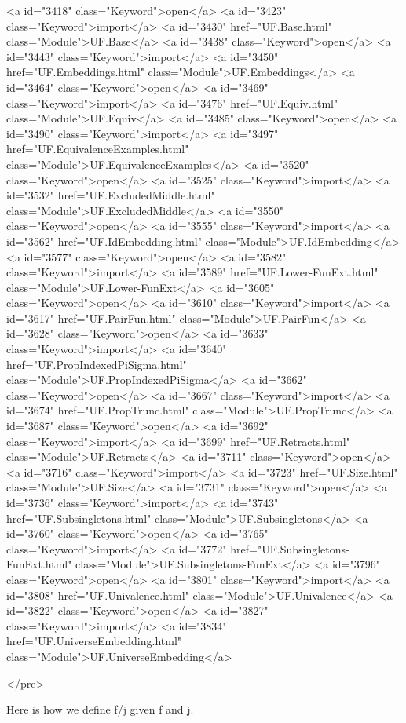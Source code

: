 <a id="3418" class="Keyword">open</a> <a id="3423" class="Keyword">import</a> <a id="3430" href="UF.Base.html" class="Module">UF.Base</a>
<a id="3438" class="Keyword">open</a> <a id="3443" class="Keyword">import</a> <a id="3450" href="UF.Embeddings.html" class="Module">UF.Embeddings</a>
<a id="3464" class="Keyword">open</a> <a id="3469" class="Keyword">import</a> <a id="3476" href="UF.Equiv.html" class="Module">UF.Equiv</a>
<a id="3485" class="Keyword">open</a> <a id="3490" class="Keyword">import</a> <a id="3497" href="UF.EquivalenceExamples.html" class="Module">UF.EquivalenceExamples</a>
<a id="3520" class="Keyword">open</a> <a id="3525" class="Keyword">import</a> <a id="3532" href="UF.ExcludedMiddle.html" class="Module">UF.ExcludedMiddle</a>
<a id="3550" class="Keyword">open</a> <a id="3555" class="Keyword">import</a> <a id="3562" href="UF.IdEmbedding.html" class="Module">UF.IdEmbedding</a>
<a id="3577" class="Keyword">open</a> <a id="3582" class="Keyword">import</a> <a id="3589" href="UF.Lower-FunExt.html" class="Module">UF.Lower-FunExt</a>
<a id="3605" class="Keyword">open</a> <a id="3610" class="Keyword">import</a> <a id="3617" href="UF.PairFun.html" class="Module">UF.PairFun</a>
<a id="3628" class="Keyword">open</a> <a id="3633" class="Keyword">import</a> <a id="3640" href="UF.PropIndexedPiSigma.html" class="Module">UF.PropIndexedPiSigma</a>
<a id="3662" class="Keyword">open</a> <a id="3667" class="Keyword">import</a> <a id="3674" href="UF.PropTrunc.html" class="Module">UF.PropTrunc</a>
<a id="3687" class="Keyword">open</a> <a id="3692" class="Keyword">import</a> <a id="3699" href="UF.Retracts.html" class="Module">UF.Retracts</a>
<a id="3711" class="Keyword">open</a> <a id="3716" class="Keyword">import</a> <a id="3723" href="UF.Size.html" class="Module">UF.Size</a>
<a id="3731" class="Keyword">open</a> <a id="3736" class="Keyword">import</a> <a id="3743" href="UF.Subsingletons.html" class="Module">UF.Subsingletons</a>
<a id="3760" class="Keyword">open</a> <a id="3765" class="Keyword">import</a> <a id="3772" href="UF.Subsingletons-FunExt.html" class="Module">UF.Subsingletons-FunExt</a>
<a id="3796" class="Keyword">open</a> <a id="3801" class="Keyword">import</a> <a id="3808" href="UF.Univalence.html" class="Module">UF.Univalence</a>
<a id="3822" class="Keyword">open</a> <a id="3827" class="Keyword">import</a> <a id="3834" href="UF.UniverseEmbedding.html" class="Module">UF.UniverseEmbedding</a>

</pre>

Here is how we define f/j given f and j.

